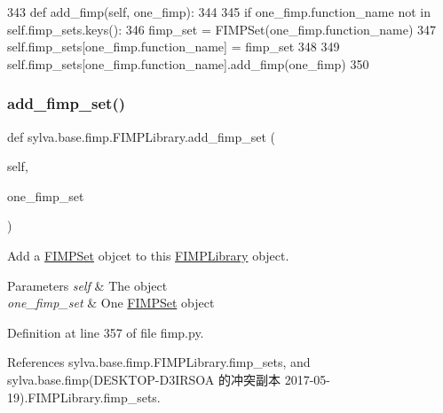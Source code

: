 \begin{DoxyCode}
343     \textcolor{keyword}{def }add\_fimp(self, one\_fimp):
344 
345         \textcolor{keywordflow}{if} one\_fimp.function\_name \textcolor{keywordflow}{not} \textcolor{keywordflow}{in} self.fimp\_sets.keys():
346             fimp\_set = FIMPSet(one\_fimp.function\_name)
347             self.fimp\_sets[one\_fimp.function\_name] = fimp\_set
348 
349         self.fimp\_sets[one\_fimp.function\_name].add\_fimp(one\_fimp)
350 
\end{DoxyCode}
\mbox{\label{classsylva_1_1base_1_1fimp_1_1_f_i_m_p_library_a43972e3c5de908178269b08f7c79c2af}} 
\subsubsection{\texorpdfstring{add\+\_\+fimp\+\_\+set()}{add\_fimp\_set()}}
{\footnotesize\ttfamily def sylva.\+base.\+fimp.\+F\+I\+M\+P\+Library.\+add\+\_\+fimp\+\_\+set (\begin{DoxyParamCaption}\item[{}]{self,  }\item[{}]{one\+\_\+fimp\+\_\+set }\end{DoxyParamCaption})}



Add a \hyperlink{classsylva_1_1base_1_1fimp_1_1_f_i_m_p_set}{F\+I\+M\+P\+Set} objcet to this \hyperlink{classsylva_1_1base_1_1fimp_1_1_f_i_m_p_library}{F\+I\+M\+P\+Library} object. 


\begin{DoxyParams}{Parameters}
{\em self} & The object \\
\hline
{\em one\+\_\+fimp\+\_\+set} & One \hyperlink{classsylva_1_1base_1_1fimp_1_1_f_i_m_p_set}{F\+I\+M\+P\+Set} object \\
\hline
\end{DoxyParams}


Definition at line 357 of file fimp.\+py.



References sylva.\+base.\+fimp.\+F\+I\+M\+P\+Library.\+fimp\+\_\+sets, and sylva.\+base.\+fimp(\+D\+E\+S\+K\+T\+O\+P-\/\+D3\+I\+R\+S\+O\+A 的冲突副本 2017-\/05-\/19).\+F\+I\+M\+P\+Library.\+fimp\+\_\+sets.


